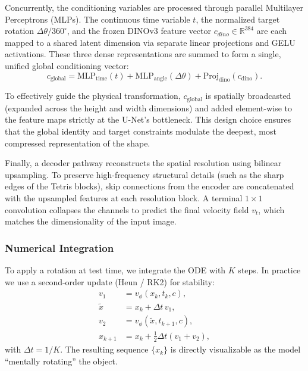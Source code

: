 \documentclass{article}
\begin{document}
Concurrently, the conditioning variables are processed through parallel Multilayer Perceptrons (MLPs). The continuous time variable $t$, the normalized target rotation $\Delta\theta / 360^{\circ}$, and the frozen DINOv3 feature vector $c_{dino} \in \mathbb{R}^{384}$ are each mapped to a shared latent dimension via separate linear projections and GELU activations. These three dense representations are summed to form a single, unified global conditioning vector:
\begin{equation}
    c_{\mathrm{global}} = \mathrm{MLP}_{\mathrm{time}}(t) + \mathrm{MLP}_{\mathrm{angle}}(\Delta\theta) + \mathrm{Proj}_{\mathrm{dino}}(c_{\mathrm{dino}}).
\end{equation}

To effectively guide the physical transformation, $c_{\mathrm{global}}$ is spatially broadcasted (expanded across the height and width dimensions) and added element-wise to the feature maps strictly at the U-Net's bottleneck. This design choice ensures that the global identity and target constraints modulate the deepest, most compressed representation of the shape.

Finally, a decoder pathway reconstructs the spatial resolution using bilinear upsampling. To preserve high-frequency structural details (such as the sharp edges of the Tetris blocks), skip connections from the encoder are concatenated with the upsampled features at each resolution block. A terminal $1 \times 1$ convolution collapses the channels to predict the final velocity field $v_t$, which matches the dimensionality of the input image.

\subsubsection{Numerical Integration}
To apply a rotation at test time, we integrate the ODE with $K$ steps. In practice we use a second-order update (Heun / RK2) for stability:
\begin{align}
    v_1 &= v_\phi(x_k, t_k, c), \\
    \tilde{x} &= x_k + \Delta t \, v_1, \\
    v_2 &= v_\phi(\tilde{x}, t_{k+1}, c), \\
    x_{k+1} &= x_k + \tfrac{1}{2}\Delta t \left(v_1 + v_2\right),
\end{align}
with $\Delta t = 1/K$. The resulting sequence $\{x_k\}$ is directly visualizable as the model ``mentally rotating'' the object.
\end{document}
